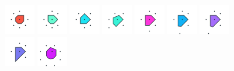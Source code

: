 \documentclass[text.tex]{subfiles}
\begin{document}
\begin{figure}[h!]
\includegraphics[width=0.12\textwidth]{img/results/circle8/circle8_126580_(1247_-516alpha_1)_005.pdf}
\includegraphics[width=0.12\textwidth]{img/results/circle8/circle8_126580_(1247_-516alpha_1)_006.pdf}
\includegraphics[width=0.12\textwidth]{img/results/circle8/circle8_126580_(1247_-516alpha_1)_007.pdf}
\includegraphics[width=0.12\textwidth]{img/results/circle8/circle8_126580_(1247_-516alpha_1)_008.pdf}
\includegraphics[width=0.12\textwidth]{img/results/circle8/circle8_126580_(1247_-516alpha_1)_009.pdf}
\includegraphics[width=0.12\textwidth]{img/results/circle8/circle8_126580_(1247_-516alpha_1)_010.pdf}
\includegraphics[width=0.12\textwidth]{img/results/circle8/circle8_126580_(1247_-516alpha_1)_011.pdf}
\includegraphics[width=0.12\textwidth]{img/results/circle8/circle8_126580_(1247_-516alpha_1)_012.pdf}
\includegraphics[width=0.12\textwidth]{img/results/circle8/circle8_126580_(1247_-516alpha_1)_013.pdf}
\end{figure}
\end{document}
